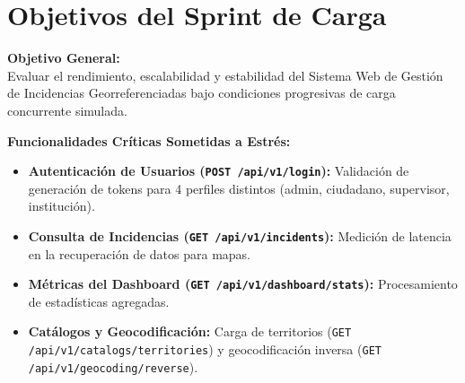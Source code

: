 \section{Objetivos del Sprint de Carga}

\textbf{Objetivo General:} \\
Evaluar el rendimiento, escalabilidad y estabilidad del Sistema Web de Gestión de Incidencias Georreferenciadas bajo condiciones progresivas de carga concurrente simulada.

\textbf{Funcionalidades Críticas Sometidas a Estrés:}
\begin{itemize}
    \item \textbf{Autenticación de Usuarios (\texttt{POST /api/v1/login}):} Validación de generación de tokens para 4 perfiles distintos (admin, ciudadano, supervisor, institución).
    \item \textbf{Consulta de Incidencias (\texttt{GET /api/v1/incidents}):} Medición de latencia en la recuperación de datos para mapas.
    \item \textbf{Métricas del Dashboard (\texttt{GET /api/v1/dashboard/stats}):} Procesamiento de estadísticas agregadas.
    \item \textbf{Catálogos y Geocodificación:} Carga de territorios (\texttt{GET /api/v1/catalogs/territories}) y geocodificación inversa (\texttt{GET /api/v1/geocoding/reverse}).
\end{itemize}
